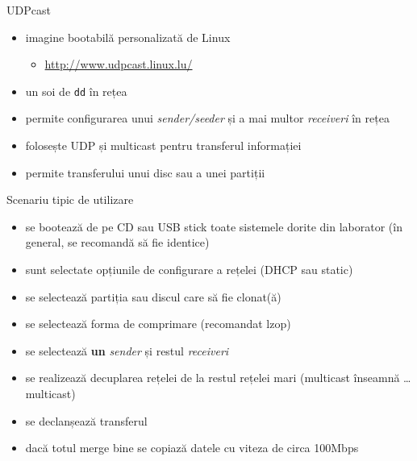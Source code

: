 \documentclass{beamer}
\begin{document}
\begin{frame}{UDPcast}
  \begin{itemize}
    \item imagine bootabilă personalizată de Linux
      \begin{itemize}
        \item \url{http://www.udpcast.linux.lu/}
      \end{itemize}
    \item un soi de \texttt{dd} în rețea
    \item permite configurarea unui \textit{sender/seeder} și a mai multor
      \textit{receiveri} în rețea
    \item folosește UDP și multicast pentru transferul informației
    \item permite transferului unui disc sau a unei partiții
  \end{itemize}
\end{frame}

\begin{frame}{Scenariu tipic de utilizare}
  \begin{itemize}
    \item se bootează de pe CD sau USB stick toate sistemele dorite din
      laborator (în general, se recomandă să fie identice)
    \item sunt selectate opțiunile de configurare a rețelei (DHCP sau static)
    \item se selectează partiția sau discul care să fie clonat(ă)
    \item se selectează forma de comprimare (recomandat lzop)
    \item se selectează \textbf{un} \textit{sender} și restul
      \textit{receiveri}
    \item se realizează decuplarea rețelei de la restul rețelei mari
      (multicast înseamnă \ldots multicast)
    \item se declanșează transferul
    \item dacă totul merge bine se copiază datele cu viteza de circa 100Mbps
  \end{itemize}
\end{frame}
\end{document}
